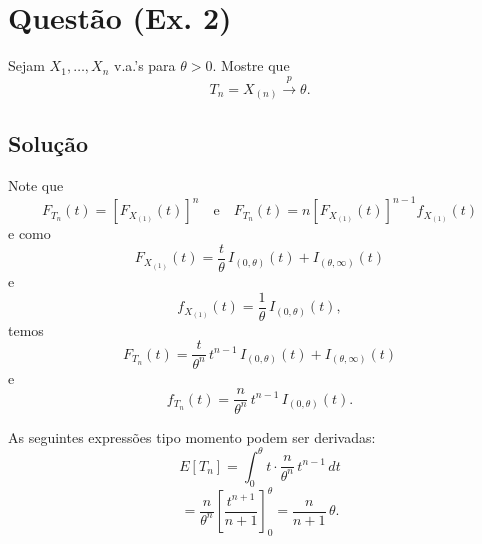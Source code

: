 \section*{Questão (Ex. 2)}
Sejam $X_1, \ldots, X_n$ v.a.'s para $\theta > 0$. Mostre que
\begin{equation}
    T_n = X_{(n)} \xrightarrow{p} \theta.
\end{equation}

\subsection*{Solução}
Note que
\begin{equation}
    F_{T_n}(t) = [F_{X_{(1)}}(t)]^n \quad \text{e} \quad F_{T_n}(t) = n [F_{X_{(1)}}(t)]^{n-1} f_{X_{(1)}}(t)
\end{equation}
e como
\begin{equation}
    F_{X_{(1)}}(t) = \frac{t}{\theta} \, I_{(0,\theta)}(t) + I_{(\theta,\infty)}(t)
\end{equation}
e
\begin{equation}
    f_{X_{(1)}}(t) = \frac{1}{\theta} \, I_{(0,\theta)}(t),
\end{equation}
temos
\begin{equation}
    F_{T_n}(t) = \frac{t}{\theta^n} \, t^{n-1} \, I_{(0,\theta)}(t) + I_{(\theta,\infty)}(t)
\end{equation}
e
\begin{equation}
    f_{T_n}(t) = \frac{n}{\theta^n} \, t^{n-1} \, I_{(0,\theta)}(t).
\end{equation}

As seguintes expressões tipo momento podem ser derivadas:
\begin{equation}
    E[T_n] = \int_{0}^{\theta} t \cdot \frac{n}{\theta^n} \, t^{n-1} \, dt
\end{equation}
\begin{equation}
    = \frac{n}{\theta^n} \left[ \frac{t^{n+1}}{n+1} \right]_{0}^{\theta} = \frac{n}{n+1} \, \theta.
\end{equation}